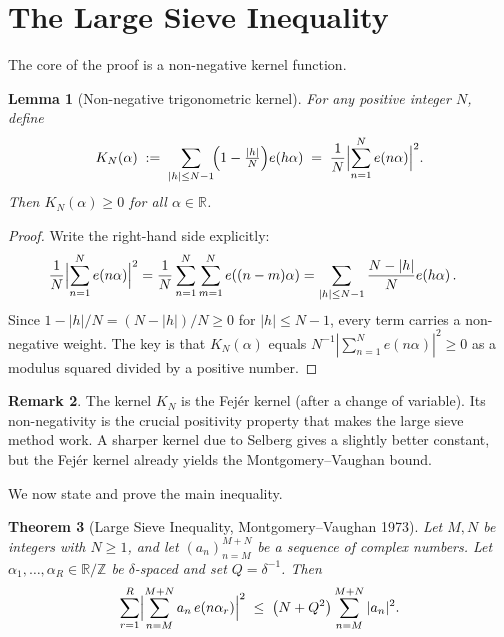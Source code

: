 \documentclass[12pt,a4paper]{amsart}
\newtheorem{theorem}{Theorem}[section]
\newtheorem{lemma}[theorem]{Lemma}
\theoremstyle{definition}
\newtheorem{remark}[theorem]{Remark}
\newcommand{\Z}{\mathbb{Z}}
\newcommand{\R}{\mathbb{R}}
\newcommand{\eexp}[1]{e\!\left(#1\right)}
\begin{document}
\section{The Large Sieve Inequality}

The core of the proof is a non-negative kernel function.

\begin{lemma}[Non-negative trigonometric kernel]\label{lem:kernel}
  For any positive integer $N$, define
  \[
    K_N(\alpha)
    \;:=\;
    \sum_{|h| \leq N-1}\!\Bigl(1 - \tfrac{|h|}{N}\Bigr)\eexp{h\alpha}
    \;=\;
    \frac{1}{N}\Bigl|\sum_{n=1}^{N}\eexp{n\alpha}\Bigr|^{2}.
  \]
  Then $K_N(\alpha) \geq 0$ for all $\alpha \in \R$.
\end{lemma}

\begin{proof}
  Write the right-hand side explicitly:
  \begin{align*}
    \frac{1}{N}\Bigl|\sum_{n=1}^{N}\eexp{n\alpha}\Bigr|^{2}
    &= \frac{1}{N}\sum_{n=1}^{N}\sum_{m=1}^{N}\eexp{(n-m)\alpha}
    = \sum_{|h| \leq N-1}\frac{N-|h|}{N}\eexp{h\alpha}.
  \end{align*}
  Since $1 - |h|/N = (N-|h|)/N \geq 0$ for $|h| \leq N-1$, every term
  carries a non-negative weight.  The key is that $K_N(\alpha)$ equals
  $N^{-1}|\sum_{n=1}^{N}\eexp{n\alpha}|^2 \geq 0$ as a modulus squared
  divided by a positive number.
\end{proof}

\begin{remark}
  The kernel $K_N$ is the Fejér kernel (after a change of variable).
  Its non-negativity is the crucial positivity property that makes the
  large sieve method work.  A sharper kernel due to Selberg gives a
  slightly better constant, but the Fejér kernel already yields the
  Montgomery--Vaughan bound.
\end{remark}

We now state and prove the main inequality.

\begin{theorem}[Large Sieve Inequality, Montgomery--Vaughan 1973]%
  \label{thm:large_sieve}
  Let $M, N$ be integers with $N \geq 1$, and let $(a_n)_{n=M}^{M+N}$ be
  a sequence of complex numbers.  Let $\alpha_1, \ldots, \alpha_R \in \R/\Z$
  be $\delta$-spaced and set $Q = \delta^{-1}$.  Then
  \[
    \sum_{r=1}^{R}\Bigl|\sum_{n=M}^{M+N} a_n\,\eexp{n\alpha_r}\Bigr|^{2}
    \;\leq\;
    \bigl(N + Q^{2}\bigr)\sum_{n=M}^{M+N}|a_n|^{2}.
  \]
\end{theorem}
\end{document}

